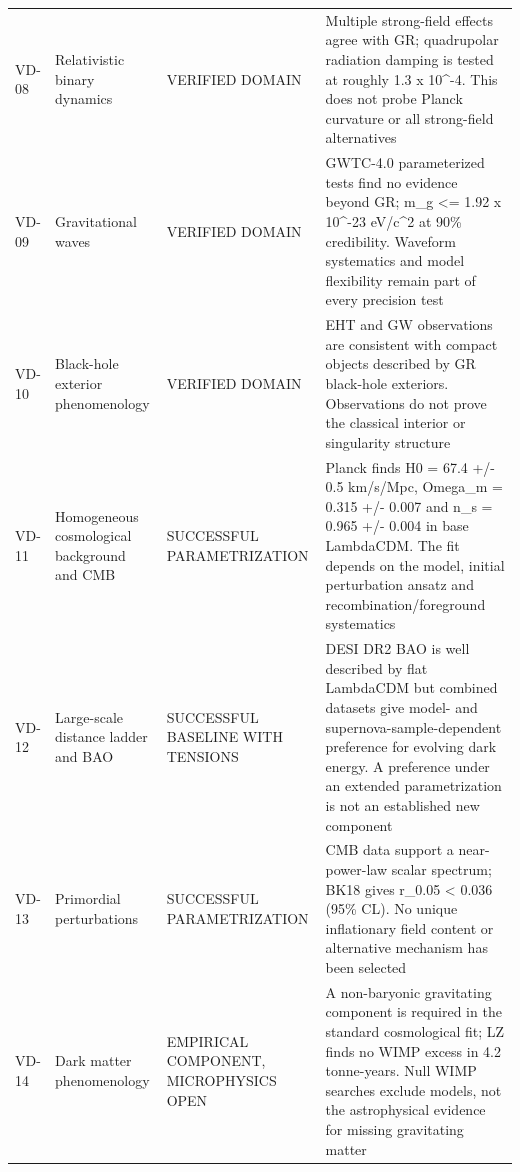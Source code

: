 \begin{longtable}{@{}p{0.75cm}p{2.35cm}p{2.55cm}p{7.35cm}@{}}
VD-08 & Relativistic binary dynamics & VERIFIED DOMAIN & Multiple strong-field effects agree with GR; quadrupolar radiation damping is tested at roughly 1.3 x 10\textasciicircum{}-4. This does not probe Planck curvature or all strong-field alternatives \\
VD-09 & Gravitational waves & VERIFIED DOMAIN & GWTC-4.0 parameterized tests find no evidence beyond GR; m\_g <= 1.92 x 10\textasciicircum{}-23 eV/c\textasciicircum{}2 at 90\% credibility. Waveform systematics and model flexibility remain part of every precision test \\
VD-10 & Black-hole exterior phenomenology & VERIFIED DOMAIN & EHT and GW observations are consistent with compact objects described by GR black-hole exteriors. Observations do not prove the classical interior or singularity structure \\
VD-11 & Homogeneous cosmological background and CMB & SUCCESSFUL PARAMETRIZATION & Planck finds H0 = 67.4 +/- 0.5 km/s/Mpc, Omega\_m = 0.315 +/- 0.007 and n\_s = 0.965 +/- 0.004 in base LambdaCDM. The fit depends on the model, initial perturbation ansatz and recombination/foreground systematics \\
VD-12 & Large-scale distance ladder and BAO & SUCCESSFUL BASELINE WITH TENSIONS & DESI DR2 BAO is well described by flat LambdaCDM but combined datasets give model- and supernova-sample-dependent preference for evolving dark energy. A preference under an extended parametrization is not an established new component \\
VD-13 & Primordial perturbations & SUCCESSFUL PARAMETRIZATION & CMB data support a near-power-law scalar spectrum; BK18 gives r\_0.05 < 0.036 (95\% CL). No unique inflationary field content or alternative mechanism has been selected \\
VD-14 & Dark matter phenomenology & EMPIRICAL COMPONENT, MICROPHYSICS OPEN & A non-baryonic gravitating component is required in the standard cosmological fit; LZ finds no WIMP excess in 4.2 tonne-years. Null WIMP searches exclude models, not the astrophysical evidence for missing gravitating matter \\
\bottomrule
\end{longtable}
\endgroup
